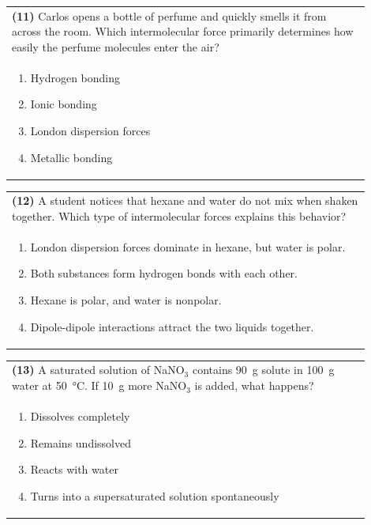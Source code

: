\documentclass{article}
\begin{document}
\vspace{0.2cm}
\noindent\begin{tabular}{|p{0.9\linewidth}|}
\hline
\textbf{(11)} Carlos opens a bottle of perfume and quickly smells it from across the room. Which intermolecular force primarily determines how easily the perfume molecules enter the air?\\[0.2cm]
\begin{minipage}[t]{0.85\linewidth}
\begin{enumerate}[label=\alph*.]
\item Hydrogen bonding
\item Ionic bonding
\item London dispersion forces
\item Metallic bonding
\end{enumerate}
\end{minipage}\\[0.2cm]
\hline
\end{tabular}

\vspace{0.2cm}
\noindent\begin{tabular}{|p{0.9\linewidth}|}
\hline
\textbf{(12)} A student notices that hexane and water do not mix when shaken together. Which type of intermolecular forces explains this behavior?\\[0.2cm]
\begin{minipage}[t]{0.85\linewidth}
\begin{enumerate}[label=\alph*.]
\item London dispersion forces dominate in hexane, but water is polar.
\item Both substances form hydrogen bonds with each other.
\item Hexane is polar, and water is nonpolar.
\item Dipole-dipole interactions attract the two liquids together.
\end{enumerate}
\end{minipage}\\[0.2cm]
\hline
\end{tabular}
\newpage

\vspace{0.2cm}
\noindent\begin{tabular}{|p{0.9\linewidth}|}
\hline
\textbf{(13)} A saturated solution of NaNO$_3$ contains 90~g solute in 100~g water at 50~°C. If 10~g more NaNO$_3$ is added, what happens?\\[0.2cm]
\begin{minipage}[t]{0.85\linewidth}
\begin{enumerate}[label=\alph*.]
\item Dissolves completely
\item Remains undissolved
\item Reacts with water
\item Turns into a supersaturated solution spontaneously
\end{enumerate}
\end{minipage}\\[0.2cm]
\hline
\end{tabular}
\end{document}
